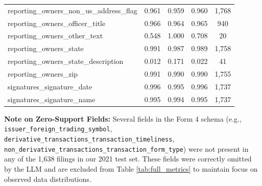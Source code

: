 \documentclass[journal, onecolumn]{IEEEtran}
\begin{document}
\begin{small}
\begin{longtable}{lcccc}
reporting\_owners\_non\_us\_address\_flag & 0.961 & 0.959 & 0.960 & 1,768 \\
reporting\_owners\_officer\_title & 0.966 & 0.964 & 0.965 & 940 \\
reporting\_owners\_other\_text & 0.548 & 1.000 & 0.708 & 20 \\
reporting\_owners\_state & 0.991 & 0.987 & 0.989 & 1,758 \\
reporting\_owners\_state\_description & 0.012 & 0.171 & 0.022 & 41 \\
reporting\_owners\_zip & 0.991 & 0.990 & 0.990 & 1,755 \\
signatures\_signature\_date & 0.996 & 0.995 & 0.996 & 1,737 \\
signatures\_signature\_name & 0.995 & 0.994 & 0.995 & 1,737 \\
\end{longtable}
\end{small}

\noindent \textbf{Note on Zero-Support Fields:} Several fields in the Form 4 schema (e.g., \texttt{issuer\_foreign\_trading\_symbol}, \texttt{derivative\_transactions\_transaction\_timeliness}, \texttt{non\_derivative\_transactions\_transaction\_form\_type}) were not present in any of the 1,638 filings in our 2021 test set. These fields were correctly omitted by the LLM and are excluded from Table \ref{tab:full_metrics} to maintain focus on observed data distributions.
\end{document}
